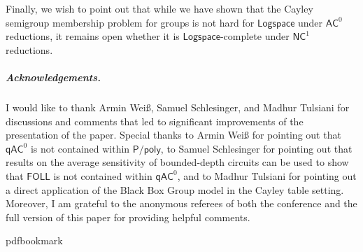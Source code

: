 \documentclass[11pt]{article}
\numberwithin{equation}{section}
\theoremstyle{definition}
\theoremstyle{plain}
\newcommand{\FOLL}{\ensuremath{\mathsf{FOLL}}}
\newcommand{\AC}{\ensuremath{\mathsf{AC}}}
\newcommand{\qAC}{\ensuremath{\mathsf{qAC}}}
\newcommand{\NC}{\ensuremath{\mathsf{NC}}}
\newcommand{\LOGSPACE}{\ensuremath{\mathsf{Logspace}}}
\newcommand{\Ppoly}{\ensuremath{\mathsf{P / poly}}}
\newcommand{\SCSM}{Cayley semigroup membership}
\newcommand{\SCSMP}{{\SCSM} problem}
\begin{document}
%
%
Finally, we wish to point out that while we have shown that
the {\SCSMP} for groups is not hard for $\LOGSPACE$ under
$\AC^0$ reductions, it remains open whether it is
$\LOGSPACE$-complete under $\NC^1$ reductions.  %

\subparagraph{Acknowledgements.} I would like to thank Armin Weiß, Samuel
Schlesinger, and Madhur Tulsiani for discussions and comments that led to
significant improvements of the presentation of the paper. Special thanks to
Armin Weiß for pointing out that $\qAC^0$ is not contained within $\Ppoly$, to
Samuel Schlesinger for pointing out that results on the average sensitivity of
bounded-depth circuits can be used to show that $\FOLL$ is not contained within
$\qAC^0$, and to Madhur Tulsiani for pointing out a direct application of the
Black Box Group model in the Cayley table setting.
%
Moreover, I am grateful to the anonymous referees of both the conference and
the full version of this paper for providing helpful comments.


\newcommand{\prelim}{Preliminary version in\ }\newcommand{\prelims}{Preliminary
  versions in\ }
\providecommand{\bibhead}[1]{}
\expandafter\ifx\csname pdfbookmark\endcsname\relax%
  \providecommand{\tocrefpdfbookmark}{}
\else\providecommand{\tocrefpdfbookmark}{%
   \hypertarget{tocreferences}{}%
   \pdfbookmark[1]{References}{tocreferences}}%
\fi
\end{document}
